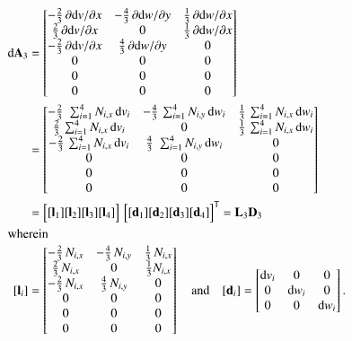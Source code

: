 \begin{subequations}
	\begin{align}
	\mathrm{d} \mathbf{A}_3 & =  \begin{bmatrix}
		- \tfrac{2}{3} \, \partial \mathrm{d} v / \partial x &  - \tfrac{4}{3} \, \partial \mathrm{d} w / \partial y &  \tfrac{1}{3} \, \partial \mathrm{d} w / \partial x   \\
		\tfrac{2}{3} \, \partial \mathrm{d} v / \partial x &  0 & \tfrac{1}{3} \, \partial \mathrm{d} w / \partial x  \\
		- \tfrac{2}{3} \, \partial \mathrm{d} v / \partial x & \tfrac{4}{3} \, \partial \mathrm{d} w / \partial y & 0 \\
		0 &  0 & 0  \\
		0 &  0 & 0  \\
		0 &  0 & 0  \end{bmatrix} \notag\\
	& = \begin{bmatrix}
		- \tfrac{2}{3} \, \, \sum\nolimits_{i=1}^4 N_{i,x} \, \mathrm{d} v_i &  - \tfrac{4}{3} \, \sum\nolimits_{i=1}^4 N_{i,y} \, \mathrm{d} w_i &  \tfrac{1}{3} \, \sum\nolimits_{i=1}^4 N_{i,x} \, \mathrm{d} w_i  \\
		\tfrac{2}{3} \, \sum\nolimits_{i=1}^4 N_{i,x} \, \mathrm{d} v_i &  0 & \tfrac{1}{3} \, \sum\nolimits_{i=1}^4 N_{i,x} \, \mathrm{d} w_i  \\
		- \tfrac{2}{3} \, \sum\nolimits_{i=1}^4 N_{i,x} \, \mathrm{d} v_i & \tfrac{4}{3} \, \, \sum\nolimits_{i=1}^4 N_{i,y} \, \mathrm{d} w_i & 0 \\
		0 &  0 & 0  \\
		0 &  0 & 0  \\
		0 &  0 & 0  \end{bmatrix} \notag \\	
	& = \begin{bmatrix}
	[\mathbf{l}_1] [\mathbf{l}_2] [\mathbf{l}_3] [\mathbf{l}_4] 
	\end{bmatrix}  \, \begin{bmatrix} [\mathbf{d}_1] [\mathbf{d}_2] [\mathbf{d}_3] [\mathbf{d}_4] \end{bmatrix}^{\mathsf{T}}
= \mathbf{L}_3 \mathbf{D}_3 \\
	\intertext{wherein}
	[\mathbf{l}_i] & = \begin{bmatrix}
		- \tfrac{2}{3} \, N_{i,x}  &  - \tfrac{4}{3} \,  N_{i,y}  &  \tfrac{1}{3} \,  N_{i,x} \\
		\tfrac{2}{3} \,  N_{i,x}  &  0 & \tfrac{1}{3}  N_{i,x}  \\
		- \tfrac{2}{3} \,  N_{i,x}  & \tfrac{4}{3} \, N_{i,y}  & 0 \\
		0 &  0 & 0  \\
		0 &  0 & 0  \\
		0 &  0 & 0  \end{bmatrix}  \quad \text{and} \quad	[\mathbf{d}_i] = \begin{bmatrix}
		\mathrm{d} v_i & 0  & 0  \\
		0 &  \mathrm{d} w_i   & 0  \\
		0 & 0 & \mathrm{d} w_i \end{bmatrix} .
	\end{align}
\end{subequations}

